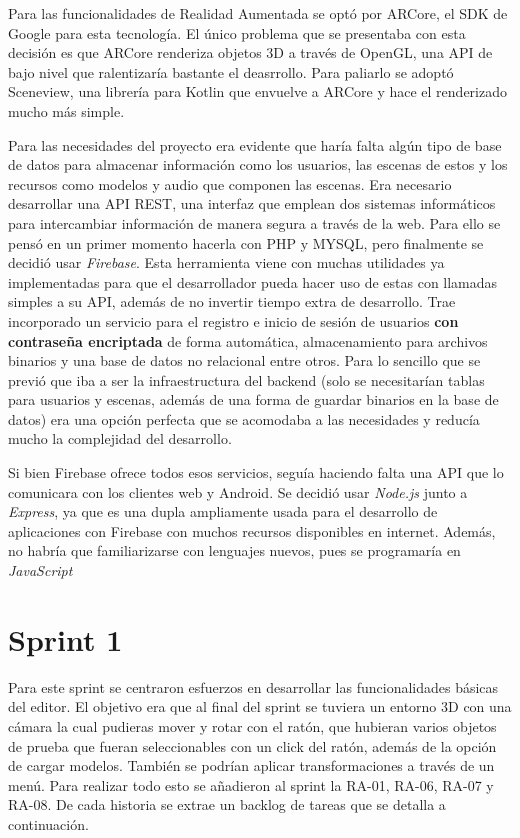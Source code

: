 Para las funcionalidades de Realidad Aumentada se optó por ARCore\cite{arcore}, el SDK de Google para esta tecnología. El único problema que se presentaba con esta decisión es que ARCore renderiza objetos 3D a través de OpenGL, una API de bajo nivel que ralentizaría bastante el deasrrollo. Para paliarlo se adoptó Sceneview\cite{sceneview}, una librería para Kotlin que envuelve a ARCore y hace el renderizado mucho más simple.

Para las necesidades del proyecto era evidente que haría falta algún tipo de base de datos para almacenar información como los usuarios, las escenas de estos y los recursos como modelos y audio que componen las escenas. Era necesario desarrollar una API REST, una interfaz que emplean dos sistemas informáticos para intercambiar información de manera segura a través de la web. Para ello se pensó en un primer momento hacerla con PHP y MYSQL, pero finalmente se decidió usar \textit{Firebase}\cite{firebase}. Esta herramienta viene con muchas utilidades ya implementadas para que el desarrollador pueda hacer uso de estas con llamadas simples a su API, además de no invertir tiempo extra de desarrollo. Trae incorporado un servicio para el registro e inicio de sesión de usuarios \textbf{con contraseña encriptada} de forma automática, almacenamiento para archivos binarios y una base de datos no relacional entre otros. Para lo sencillo que se previó que iba a ser la infraestructura del backend (solo se necesitarían tablas para usuarios y escenas, además de una forma de guardar binarios en la base de datos) era una opción perfecta que se acomodaba a las necesidades y reducía mucho la complejidad del desarrollo.

Si bien Firebase ofrece todos esos servicios, seguía haciendo falta una API que lo comunicara con los clientes web y Android. Se decidió usar \textit{Node.js}\cite{nodejs} junto a \textit{Express}\cite{express}, ya que es una dupla ampliamente usada para el desarrollo de aplicaciones con Firebase con muchos recursos disponibles en internet. Además, no habría que familiarizarse con lenguajes nuevos, pues se programaría en \textit{JavaScript}

\section{Sprint 1}

Para este sprint se centraron esfuerzos en desarrollar las funcionalidades básicas del editor. El objetivo era que al final del sprint se tuviera un entorno 3D con una cámara la cual pudieras mover y rotar con el ratón, que hubieran varios objetos de prueba que fueran seleccionables con un click del ratón, además de la opción de cargar modelos. También se podrían aplicar transformaciones a través de un menú. Para realizar todo esto se añadieron al sprint la RA-01, RA-06, RA-07 y RA-08. De cada historia se extrae un backlog de tareas que se detalla a continuación.

